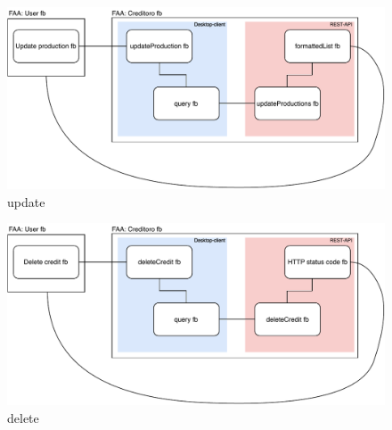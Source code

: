\begin{figure}[h]
\centering
\includegraphics[scale=1]{figures/EAST-ADL/update.pdf}
\caption{update}
\label{fig:update}
\end{figure}
\begin{figure}[h]
\centering
\includegraphics[scale=1]{figures/EAST-ADL/delete.pdf}
\caption{delete}
\label{fig:delete}
\end{figure}

